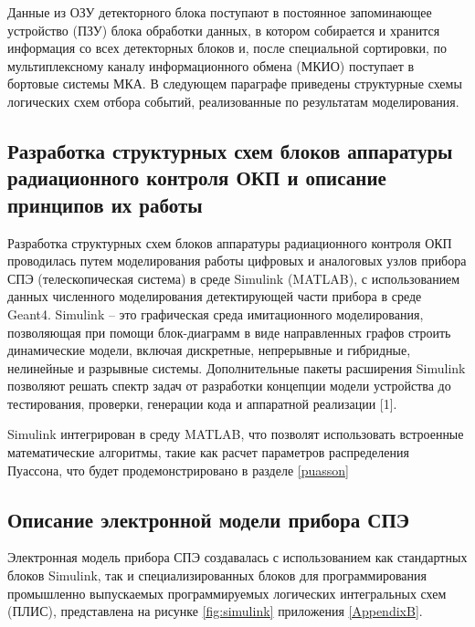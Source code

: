 Данные из ОЗУ детекторного блока поступают в постоянное запоминающее устройство (ПЗУ) блока обработки данных, в котором собирается и хранится информация со всех детекторных блоков и, после специальной сортировки, по мультиплексному каналу информационного обмена (МКИО) поступает в бортовые системы МКА. В следующем параграфе приведены структурные схемы логических схем отбора событий, реализованные по результатам моделирования. 

\subsection{Разработка структурных схем блоков аппаратуры радиационного контроля ОКП и описание принципов их работы}

Разработка структурных схем блоков аппаратуры радиационного контроля ОКП проводилась путем моделирования работы цифровых и аналоговых узлов прибора СПЭ (телескопическая система) в среде Simulink (MATLAB), с использованием данных численного моделирования детектирующей части прибора в среде Geant4. 
Simulink – это графическая среда имитационного моделирования, позволяющая при помощи блок-диаграмм в виде направленных графов строить динамические модели, включая дискретные, непрерывные и гибридные, нелинейные и разрывные системы. Дополнительные пакеты расширения Simulink позволяют решать спектр задач от разработки концепции модели устройства до тестирования, проверки, генерации кода и аппаратной реализации [1].

Simulink интегрирован в среду MATLAB, что позволят использовать встроенные математические алгоритмы, такие как расчет параметров распределения Пуассона, что будет продемонстрировано в разделе \ref{puasson}

\subsection{ Описание электронной модели прибора СПЭ}

Электронная модель прибора СПЭ создавалась с использованием как стандартных блоков Simulink, так и специализированных блоков для программирования промышленно выпускаемых программируемых логических интегральных схем (ПЛИС), представлена на рисунке \ref{fig:simulink} приложения \ref{AppendixB}.


